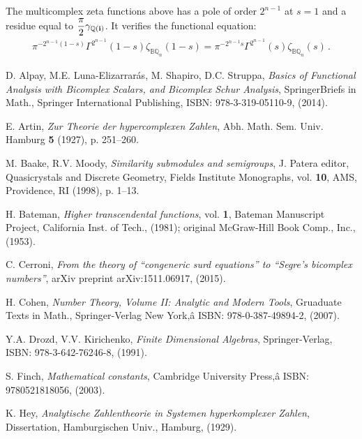 \documentclass[reqno]{amsart}
\theoremstyle{plain}
\theoremstyle{definition}
\theoremstyle{remark}
\numberwithin{equation}{section}
\begin{document}
The multicomplex zeta functions above has a pole of order $2^{n-1}$ at
$s=1$ and a residue equal to
$\displaystyle\frac{\pi}{2}\gamma_{{{\mathbb Q}}({{\bf i}})}$. It verifies the
functional equation:
\begin{align}
  \pi^{-2^{n-1}(1-s)} \Gamma^{2^{n-1}}(1-s)\zeta_{{{\mathbb B}{\mathbb Q}}_n}(1-s) =
  \pi^{-2^{n-1}s} \Gamma^{2^{n-1}}(s)\zeta_{{{\mathbb B}{\mathbb Q}}_n}(s)\,.
\end{align}

\bigskip



\begin{thebibliography}{999}

 D. Alpay, M.E. Luna-Elizarrar\'as, M. Shapiro,
  D.C. Struppa, {\em Basics of Functional Analysis with Bicomplex
    Scalars, and Bicomplex Schur Analysis}, SpringerBriefs in Math.,
  Springer International Publishing, ISBN: 978-3-319-05110-9, (2014).

 E. Artin, {\em Zur Theorie der hypercomplexen Zahlen},
  Abh. Math. Sem. Univ. Hamburg {\bf 5} (1927), p. 251--260.

 M. Baake, R.V. Moody, {\em Similarity submodules and
    semigroups}, J. Patera editor, Quasicrystals and Discrete
  Geometry, Fields Institute Monographs, vol. {\bf 10}, AMS,
  Providence, RI (1998), p. 1--13.

 H. Bateman, {\em Higher transcendental functions},
  vol. {\bf 1}, Bateman Manuscript Project, California Inst. of Tech.,
  (1981); original McGraw-Hill Book Comp., Inc., (1953).

 C. Cerroni, {\em From the theory of ``congeneric
    surd equations'' to ``Segre's bicomplex numbers''}, arXiv preprint
  arXiv:1511.06917, (2015).

 H. Cohen, {\em Number Theory, Volume II: Analytic and
    Modern Tools}, Gruaduate Texts in Math., Springer-Verlag New
  York,â ISBN: 978-0-387-49894-2, (2007).

 Y.A. Drozd, V.V. Kirichenko, {\em Finite Dimensional
    Algebras}, Springer-Verlag, ISBN: 978-3-642-76246-8, (1991).

 S. Finch, {\em Mathematical constants}, Cambridge
  University Press,â ISBN: 9780521818056, (2003).

 K. Hey, {\em Analytische Zahlentheorie in Systemen
    hyperkomplexer Zahlen}, Dissertation, Hamburgischen Univ.,
  Hamburg, (1929).


\end{thebibliography}
\end{document}
